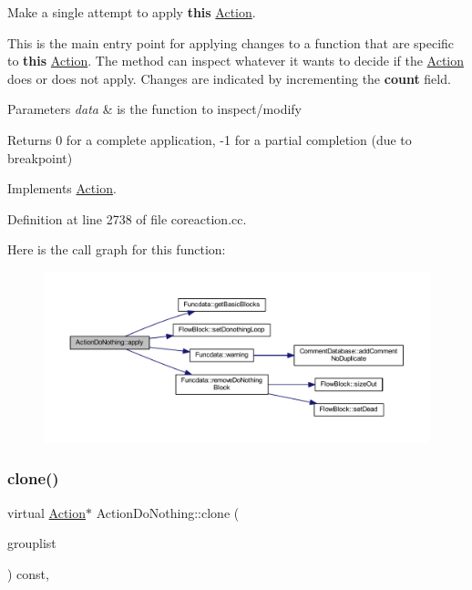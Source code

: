 Make a single attempt to apply {\bfseries{this}} \mbox{\hyperlink{class_action}{Action}}. 

This is the main entry point for applying changes to a function that are specific to {\bfseries{this}} \mbox{\hyperlink{class_action}{Action}}. The method can inspect whatever it wants to decide if the \mbox{\hyperlink{class_action}{Action}} does or does not apply. Changes are indicated by incrementing the {\bfseries{count}} field. 
\begin{DoxyParams}{Parameters}
{\em data} & is the function to inspect/modify \\
\hline
\end{DoxyParams}
\begin{DoxyReturn}{Returns}
0 for a complete application, -\/1 for a partial completion (due to breakpoint) 
\end{DoxyReturn}


Implements \mbox{\hyperlink{class_action_aac1c3999d6c685b15f5d9765a4d04173}{Action}}.



Definition at line 2738 of file coreaction.\+cc.

Here is the call graph for this function\+:
\nopagebreak
\begin{figure}[H]
\begin{center}
\leavevmode
\includegraphics[width=350pt]{class_action_do_nothing_a731f2fd0ba173c40a794de849bfabe4b_cgraph}
\end{center}
\end{figure}
\mbox{\label{class_action_do_nothing_abe01dd8198e672a33f3a9fec28376284}} 
\subsubsection{\texorpdfstring{clone()}{clone()}}
{\footnotesize\ttfamily virtual \mbox{\hyperlink{class_action}{Action}}$\ast$ Action\+Do\+Nothing\+::clone (\begin{DoxyParamCaption}\item[{const \mbox{\hyperlink{class_action_group_list}{Action\+Group\+List}} \&}]{grouplist }\end{DoxyParamCaption}) const\hspace{0.3cm}{\ttfamily [inline]}, {\ttfamily [virtual]}}



